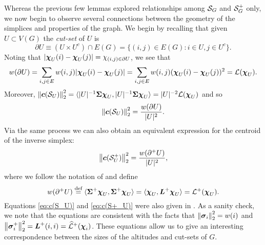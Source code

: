 Whereas the previous few lemmas explored relationships among $\mathcal{S}_G$ and $\mathcal{S}_G^+$ only, we now begin to observe several connections between the geometry of the simplices and properties of the graph. We begin by recalling that given $U\subset V(G)$ the \emph{cut-set} of $U$ is 
\[\partial U \equiv (U\times U^c)\cap E(G)= \{(i,j)\in E(G): i\in U, j\in U^c\}.\]
Noting that $|\boldsymbol{\chi}_U(i)-\boldsymbol{\chi}_U(j)|=\chi_{(i,j)\in \partial U}$, we see that
\begin{align*}
w(\partial U) = \sum_{i,j\in E} w(i,j)|\boldsymbol{\chi}_U(i)-\boldsymbol{\chi}_U(j)| = \sum_{i,j\in E} w(i,j)(\boldsymbol{\chi}_U(i)-\boldsymbol{\chi}_U(j))^2 = \mathcal{L}(\boldsymbol{\chi}_U). 
\end{align*}
Moreover, $\norm{\vb*{c}(\mathcal{S}_U)}^2_2 = \langle |U|^{-1} \boldsymbol{\Sigma}\boldsymbol{\chi}_U,|U|^{-1} \boldsymbol{\Sigma}\boldsymbol{\chi}_U\rangle = |U|^{-2} \mathcal{L}(\boldsymbol{\chi}_U)$ and so 
\begin{equation}
\label{eq:c(S_U)}
\norm{\vb*{c}(\mathcal{S}_U)}_2^2 = \frac{w(\partial U)}{|U|^2}.
\end{equation}
Via the same process we can also obtain an equivalent expression for the centroid of the inverse simplex: 
\begin{equation}
\label{eq:c(S+_U)}
\norm{\vb*{c}(\mathcal{S}^+_U)}_2^2 = \frac{w(\partial^+ U)}{|U|^2},
\end{equation}
where we follow the notation of \cite{devriendt2018simplex} and define \begin{equation}
\label{eq:w(d^+)}
w(\partial^+U) \overset{\text{def}}{=}  \langle \boldsymbol{\Sigma}^+\boldsymbol{\chi}_U,\boldsymbol{\Sigma}^+\boldsymbol{\chi}_U\rangle=\langle \boldsymbol{\chi}_U,\vb*{L}^+\boldsymbol{\chi}_U\rangle=\mathcal{L}^+(\boldsymbol{\chi}_U).
\end{equation} 
Equations \eqref{eq:c(S_U)} and \eqref{eq:c(S+_U)} were also given in \cite{devriendt2018simplex}. As a sanity check, we note that the equations are consistent with the facts that $\norm{\vb*{\sigma}_i}_2^2 = w(i)$ and $\norm{\vb*{\sigma}_i^+}_2^2 = \vb*{L}^+(i,i) = \widehat{\mathcal{L}}^+(\boldsymbol{\chi}_i)$. These equations allow us to give an interesting correspondence between the sizes of the altitudes and cut-sets of $G$. 

